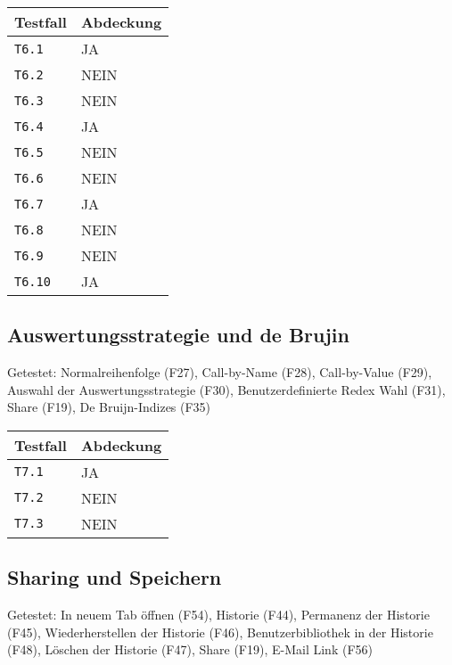 \documentclass[parskip=full,11pt,twoside]{scrartcl}
\begin{document}
    \label{shortcuts}
    \begin{center}
        \begin{tabular}{ p{9cm} p{4cm}}
            Testfall & Abdeckung \\ \hline
            \texttt{T6.1} & \cellcolor{green!20}JA \\ \hline
            \texttt{T6.2} & \cellcolor{red!20}NEIN \\ \hline
            \texttt{T6.3} & \cellcolor{red!20}NEIN \\ \hline
            \texttt{T6.4} & \cellcolor{green!20}JA \\ \hline
            \texttt{T6.5} & \cellcolor{red!20}NEIN \\ \hline
            \texttt{T6.6} & \cellcolor{red!20}NEIN \\ \hline
            \texttt{T6.7} & \cellcolor{green!20}JA \\ \hline
            \texttt{T6.8} & \cellcolor{red!20}NEIN \\ \hline
            \texttt{T6.9} & \cellcolor{red!20}NEIN \\ \hline
            \texttt{T6.10} & \cellcolor{green!20}JA \\ \hline
        \end{tabular}
    \end{center}

\subsection{Auswertungsstrategie und de Brujin}
    Getestet:
    Normalreihenfolge (F27),
    Call-by-Name (F28),
    Call-by-Value (F29),
    Auswahl der Auswertungsstrategie (F30),
    Benutzerdefinierte Redex Wahl (F31),
    Share (F19),
    De Bruijn-Indizes (F35)

    \label{shortcuts}
    \begin{center}
        \begin{tabular}{ p{9cm} p{4cm}}
            Testfall & Abdeckung \\ \hline
            \texttt{T7.1} & \cellcolor{green!20}JA \\ \hline
            \texttt{T7.2} & \cellcolor{red!20}NEIN \\ \hline
            \texttt{T7.3} & \cellcolor{red!20}NEIN \\ \hline
        \end{tabular}
    \end{center}

\subsection{Sharing und Speichern}
    Getestet:
    In neuem Tab öffnen (F54),
    Historie (F44),
    Permanenz der Historie (F45),
    Wiederherstellen der Historie (F46),
    Benutzerbibliothek in der Historie (F48),
    Löschen der Historie (F47),
    Share (F19),
    E-Mail Link (F56)
\end{document}
